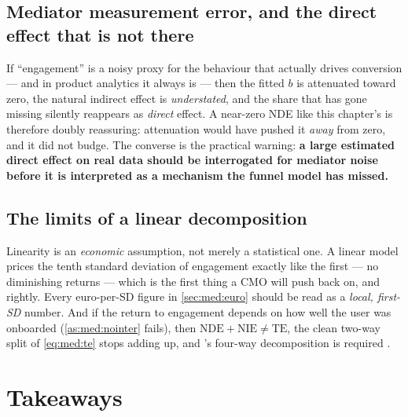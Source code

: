 \subsection*{Mediator measurement error, and the direct effect that is not there}

If ``engagement'' is a noisy proxy for the behaviour that actually drives conversion --- and in
product analytics it always is --- then the fitted $b$ is attenuated toward zero, the natural
indirect effect is \emph{understated}, and the share that has gone missing silently reappears as
\emph{direct} effect. A near-zero NDE like this chapter's is therefore doubly reassuring: attenuation
would have pushed it \emph{away} from zero, and it did not budge. The converse is the practical
warning: \textbf{a large estimated direct effect on real data should be interrogated for mediator
noise before it is interpreted as a mechanism the funnel model has missed.}

\subsection*{The limits of a linear decomposition}

Linearity is an \emph{economic} assumption, not merely a statistical one. A linear model prices the
tenth standard deviation of engagement exactly like the first --- no diminishing returns --- which is
the first thing a CMO will push back on, and rightly. Every euro-per-SD figure in
\cref{sec:med:euro} should be read as a \emph{local, first-SD} number. And if the return to
engagement depends on how well the user was onboarded (\cref{as:med:nointer} fails), then
$\text{NDE} + \text{NIE} \neq \text{TE}$, the clean two-way split of \cref{eq:med:te} stops adding
up, and \citeauthor{vanderweele2014}'s four-way decomposition is required
\citep{vanderweele2014, vanderweele2015}.

\section{Takeaways}
\label{sec:med:take}

